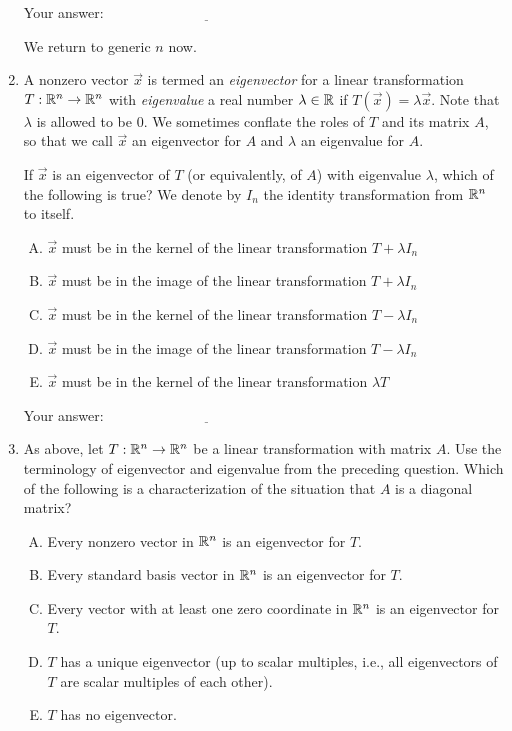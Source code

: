 \documentclass[10pt]{amsart}
\begin{document}
\begin{enumerate}
  \vspace{0.1in}
  Your answer: $\underline{\qquad\qquad\qquad\qquad\qquad\qquad\qquad}$
  \vspace{0.6in}

  We return to generic $n$ now.

\item A nonzero vector $\vec{x}$ is termed an {\em eigenvector} for a
  linear transformation $T: \mathbb{R}^n \to \mathbb{R}^n$ with {\em eigenvalue} a
  real number $\lambda \in \mathbb{R}$ if $T(\vec{x}) = \lambda\vec{x}$. Note
  that $\lambda$ is allowed to be $0$. We sometimes conflate the roles
  of $T$ and its matrix $A$, so that we call $\vec{x}$ an eigenvector
  for $A$ and $\lambda$ an eigenvalue for $A$.

  If $\vec{x}$ is an eigenvector of $T$ (or equivalently, of $A$) with
  eigenvalue $\lambda$, which of the following is true? We denote by
  $I_n$ the identity transformation from $\mathbb{R}^n$ to itself.

  \begin{enumerate}[(A)]
  \item $\vec{x}$ must be in the kernel of the linear transformation
    $T + \lambda I_n$
  \item $\vec{x}$ must be in the image of the linear transformation $T
    + \lambda I_n$
  \item $\vec{x}$ must be in the kernel of the linear transformation
    $T - \lambda I_n$
  \item $\vec{x}$ must be in the image of the linear transformation $T
    - \lambda I_n$
  \item $\vec{x}$ must be in the kernel of the linear transformation
    $\lambda T$
  \end{enumerate}

  \vspace{0.1in}
  Your answer: $\underline{\qquad\qquad\qquad\qquad\qquad\qquad\qquad}$
  \vspace{0.1in}

\item As above, let $T: \mathbb{R}^n \to \mathbb{R}^n$ be a linear transformation with
  matrix $A$. Use the terminology of eigenvector and eigenvalue from
  the preceding question. Which of the following is a characterization
  of the situation that $A$ is a diagonal matrix?

  \begin{enumerate}[(A)]
  \item Every nonzero vector in $\mathbb{R}^n$ is an eigenvector for $T$.
  \item Every standard basis vector in $\mathbb{R}^n$ is an eigenvector for $T$.
  \item Every vector with at least one zero coordinate in $\mathbb{R}^n$ is an
    eigenvector for $T$.
  \item $T$ has a unique eigenvector (up to scalar multiples, i.e.,
    all eigenvectors of $T$ are scalar multiples of each other).
  \item $T$ has no eigenvector.
  \end{enumerate}


\end{enumerate}
\end{document}
